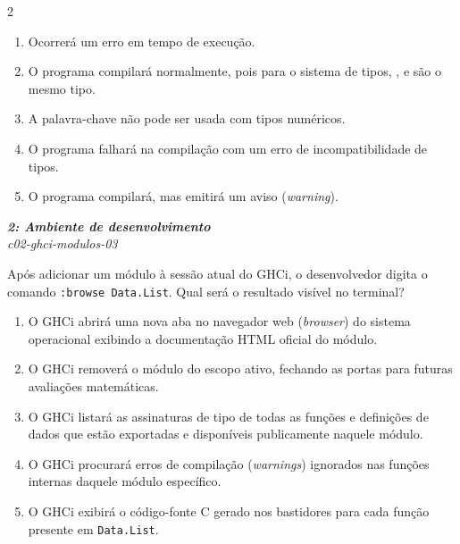 \documentclass[a4paper,10pt,brazil]{article}
\begin{document}
\begin{multicols}{2}
\begin{enumerate}
  \item Ocorrerá um erro em tempo de execução.

  \item O programa compilará normalmente, pois para o sistema de tipos, ,  e  são o mesmo tipo.

  \item A palavra-chave  não pode ser usada com tipos numéricos.

  \item O programa falhará na compilação com um erro de incompatibilidade de tipos.

  \item O programa compilará, mas emitirá um aviso (\emph{warning}).


\end{enumerate}

\begin{flushright}
  \footnotesize
  \textit{\textbf{2: Ambiente de desenvolvimento}}\\
  \textit{c02-ghci-modulos-03}\\

\end{flushright}
Após adicionar um módulo à sessão atual do GHCi, o desenvolvedor digita o comando \texttt{:browse Data.List}. Qual será o resultado visível no terminal?

\begin{enumerate}
  \item O GHCi abrirá uma nova aba no navegador web (\emph{browser}) do sistema operacional exibindo a documentação HTML oficial do módulo.

  \item O GHCi removerá o módulo do escopo ativo, fechando as portas para futuras avaliações matemáticas.

  \item O GHCi listará as assinaturas de tipo de todas as funções e definições de dados que estão exportadas e disponíveis publicamente naquele módulo.

  \item O GHCi procurará erros de compilação (\emph{warnings}) ignorados nas funções internas daquele módulo específico.

  \item O GHCi exibirá o código-fonte C gerado nos bastidores para cada função presente em \texttt{Data.List}.



\end{enumerate}
\end{multicols}
\end{document}
